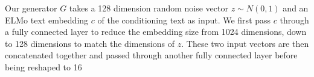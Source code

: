 Our generator $G$ takes a 128 dimension random noise vector $z \sim N(0, 1)$ and an ELMo text embedding $c$ of the conditioning text as input. We first pass $c$ through a fully connected layer to reduce the embedding size from 1024 dimensions, down to 128 dimensions to match the dimensions of $z$. These two input vectors are then concatenated together and passed through another fully connected layer before being reshaped to 16
